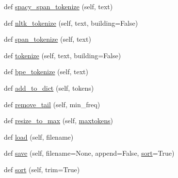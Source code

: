 \begin{DoxyCompactItemize}
\item 
def \hyperlink{classparlai_1_1agents_1_1legacy__agents_1_1seq2seq_1_1dict__v0_1_1DictionaryAgent_a9e091c9b3daf9f5e7496f7aac6f473eb}{spacy\+\_\+span\+\_\+tokenize} (self, text)
\item 
def \hyperlink{classparlai_1_1agents_1_1legacy__agents_1_1seq2seq_1_1dict__v0_1_1DictionaryAgent_a67ebc0fd49a9bcb850ae3d693b29b304}{nltk\+\_\+tokenize} (self, text, building=False)
\item 
def \hyperlink{classparlai_1_1agents_1_1legacy__agents_1_1seq2seq_1_1dict__v0_1_1DictionaryAgent_acb9c4128aa95e0a6dcd787c33395c877}{span\+\_\+tokenize} (self, text)
\item 
def \hyperlink{classparlai_1_1agents_1_1legacy__agents_1_1seq2seq_1_1dict__v0_1_1DictionaryAgent_aa551af633278b71b0a8da65180b79202}{tokenize} (self, text, building=False)
\item 
def \hyperlink{classparlai_1_1agents_1_1legacy__agents_1_1seq2seq_1_1dict__v0_1_1DictionaryAgent_a7ccda0fb5cabe49fc68551da6fe03bff}{bpe\+\_\+tokenize} (self, text)
\item 
def \hyperlink{classparlai_1_1agents_1_1legacy__agents_1_1seq2seq_1_1dict__v0_1_1DictionaryAgent_aeae5dabd12a2ab943f75d01a1dbb091c}{add\+\_\+to\+\_\+dict} (self, tokens)
\item 
def \hyperlink{classparlai_1_1agents_1_1legacy__agents_1_1seq2seq_1_1dict__v0_1_1DictionaryAgent_accabae63114f30e336e560ee1b7420da}{remove\+\_\+tail} (self, min\+\_\+freq)
\item 
def \hyperlink{classparlai_1_1agents_1_1legacy__agents_1_1seq2seq_1_1dict__v0_1_1DictionaryAgent_ab5351c542cbfdeeb9a2bc24227253fb3}{resize\+\_\+to\+\_\+max} (self, \hyperlink{classparlai_1_1agents_1_1legacy__agents_1_1seq2seq_1_1dict__v0_1_1DictionaryAgent_a802c4b3cfa8596436a8a7daee7e94b10}{maxtokens})
\item 
def \hyperlink{classparlai_1_1agents_1_1legacy__agents_1_1seq2seq_1_1dict__v0_1_1DictionaryAgent_a4a13c4937c3cd5bb14d5f28658ece153}{load} (self, filename)
\item 
def \hyperlink{classparlai_1_1agents_1_1legacy__agents_1_1seq2seq_1_1dict__v0_1_1DictionaryAgent_ab2838da6f97c13b8eae241ac6db59417}{save} (self, filename=None, append=False, \hyperlink{classparlai_1_1agents_1_1legacy__agents_1_1seq2seq_1_1dict__v0_1_1DictionaryAgent_a346cc45c8e6eba82cb76878445e843cf}{sort}=True)
\item 
def \hyperlink{classparlai_1_1agents_1_1legacy__agents_1_1seq2seq_1_1dict__v0_1_1DictionaryAgent_a346cc45c8e6eba82cb76878445e843cf}{sort} (self, trim=True)

\end{DoxyCompactItemize}
